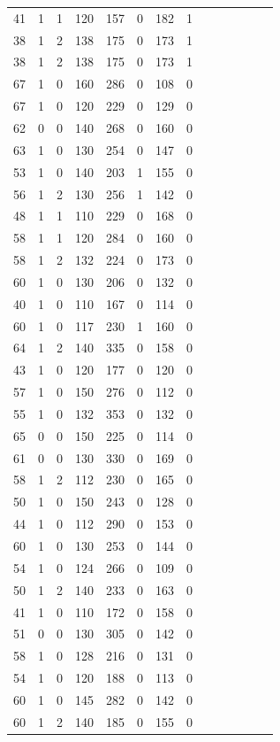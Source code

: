 \documentclass{article}
\begin{document}
\begin{longtable}{|c|c|c|c|c|c|c|c|c|c|c|c|c|c|}
41 & 1 & 1 & 120 & 157 & 0 & 182 & 1\\
38 & 1 & 2 & 138 & 175 & 0 & 173 & 1\\
38 & 1 & 2 & 138 & 175 & 0 & 173 & 1\\
67 & 1 & 0 & 160 & 286 & 0 & 108 & 0\\
67 & 1 & 0 & 120 & 229 & 0 & 129 & 0\\
62 & 0 & 0 & 140 & 268 & 0 & 160 & 0\\
63 & 1 & 0 & 130 & 254 & 0 & 147 & 0\\
53 & 1 & 0 & 140 & 203 & 1 & 155 & 0\\
56 & 1 & 2 & 130 & 256 & 1 & 142 & 0\\
48 & 1 & 1 & 110 & 229 & 0 & 168 & 0\\
58 & 1 & 1 & 120 & 284 & 0 & 160 & 0\\
58 & 1 & 2 & 132 & 224 & 0 & 173 & 0\\
60 & 1 & 0 & 130 & 206 & 0 & 132 & 0\\
40 & 1 & 0 & 110 & 167 & 0 & 114 & 0\\
60 & 1 & 0 & 117 & 230 & 1 & 160 & 0\\
64 & 1 & 2 & 140 & 335 & 0 & 158 & 0\\
43 & 1 & 0 & 120 & 177 & 0 & 120 & 0\\
57 & 1 & 0 & 150 & 276 & 0 & 112 & 0\\
55 & 1 & 0 & 132 & 353 & 0 & 132 & 0\\
65 & 0 & 0 & 150 & 225 & 0 & 114 & 0\\
61 & 0 & 0 & 130 & 330 & 0 & 169 & 0\\
58 & 1 & 2 & 112 & 230 & 0 & 165 & 0\\
50 & 1 & 0 & 150 & 243 & 0 & 128 & 0\\
44 & 1 & 0 & 112 & 290 & 0 & 153 & 0\\
60 & 1 & 0 & 130 & 253 & 0 & 144 & 0\\
54 & 1 & 0 & 124 & 266 & 0 & 109 & 0\\
50 & 1 & 2 & 140 & 233 & 0 & 163 & 0\\
41 & 1 & 0 & 110 & 172 & 0 & 158 & 0\\
51 & 0 & 0 & 130 & 305 & 0 & 142 & 0\\
58 & 1 & 0 & 128 & 216 & 0 & 131 & 0\\
54 & 1 & 0 & 120 & 188 & 0 & 113 & 0\\
60 & 1 & 0 & 145 & 282 & 0 & 142 & 0\\
60 & 1 & 2 & 140 & 185 & 0 & 155 & 0\\

\end{longtable}
\end{document}
